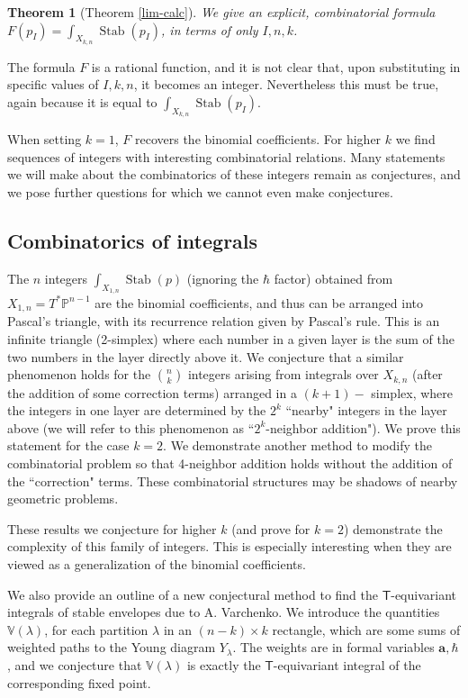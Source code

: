 \documentclass[12 pt]{article}
\theoremstyle{plain}
\theoremstyle{plain}
\newtheorem*{theorem*}{Theorem}
\theoremstyle{plain}
\theoremstyle{plain}
\theoremstyle{plain}
\theoremstyle{plain}
\theoremstyle{plain}
\theoremstyle{plain}
\theoremstyle{plain}
\theoremstyle{plain}
\theoremstyle{remark}
\theoremstyle{remark}
\theoremstyle{definition}
\theoremstyle{definition}
\theoremstyle{definition}
\theoremstyle{definition}
\theoremstyle{definition}
\theoremstyle{definition}
\DeclareMathOperator{\Stab}{Stab}
\newcommand{\bT}{\mathsf{T}}
\begin{document}
\begin{theorem*}[Theorem \ref{lim-calc}]

We give an explicit, combinatorial formula $F(p_I)=\int_{X_{k,n}}\Stab(p_I)$, in terms of only $I,n,k$. 
\end{theorem*}

The formula $F$ is a rational function, and it is not clear that, upon substituting in specific values of $I,k,n$, it becomes an integer. Nevertheless this must be true, again because it is equal to $\int_{X_{k,n}}\Stab(p_I)$. 


When setting $k=1$, $F$ recovers the binomial coefficients. For higher $k$ we find sequences of integers with interesting combinatorial relations. Many statements we will make about the combinatorics of these integers remain as conjectures, and we pose further questions for which we cannot even make conjectures. 

\subsection{Combinatorics of integrals}

The $n$ integers $\int_{X_{1,n}}\Stab(p)$ (ignoring the $\hbar$ factor) obtained from $X_{1,n}=T^*\mathbb{P}^{n-1}$ are the binomial coefficients, and thus can be arranged into Pascal's triangle, with its recurrence relation given by Pascal's rule. This is an infinite triangle (2-simplex) where each number in a given layer is the sum of the two numbers in the layer directly above it. We conjecture that a similar phenomenon holds for the $\binom{n}{k}$ integers arising from integrals over $X_{k,n}$ (after the addition of some correction terms) arranged in a $(k+1)-$ simplex, where the integers in one layer are determined by the $2^{k}$ ``nearby" integers in the layer above (we will refer to this phenomenon as ``$2^{k}$-neighbor addition"). We prove this statement for the case $k=2$. We demonstrate another method to modify the combinatorial problem so that 4-neighbor addition holds without the addition of the ``correction" terms. These combinatorial structures may be shadows of nearby geometric problems. 

These results we conjecture for higher $k$ (and prove for $k=2$) demonstrate the complexity of this family of integers. This is especially interesting when they are viewed as a generalization of the binomial coefficients. 

We also provide an outline of a new conjectural method to find the $\bT$-equivariant integrals of stable envelopes due to A. Varchenko. We introduce the quantities $\mathbb{V}({\lambda})$, for each partition $\lambda$ in an $(n-k)\times k$ rectangle, which are some sums of weighted paths to the Young diagram $Y_\lambda$. The weights are in formal variables $\textbf{a},\hbar$, and we conjecture that $\mathbb{V}(\lambda)$ is exactly the $\bT$-equivariant integral of the corresponding fixed point. 
\end{document}
